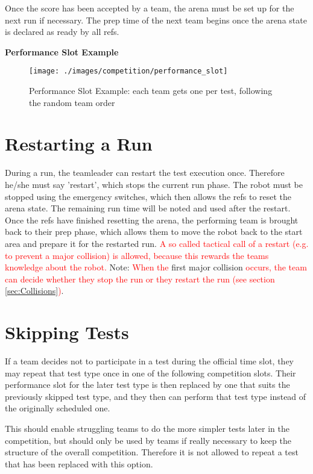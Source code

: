 Once the score has been accepted by a team,
the arena must be set up for the next run if necessary.
The prep time of the next team begins once the arena state is declared as ready by all refs.

\textbf{Performance Slot Example}

\begin{figure} [h!]
	\begin{center}
		\texttt{[image: ./images/competition/performance\_slot]}
	\end{center}
	\caption{Performance Slot Example: each team gets one per test, following the random team order}
	\label{fig:performance slot example}
\end{figure}


\section{Restarting a Run}

During a run, the teamleader can restart the test execution once.
Therefore he/she must say 'restart', which stops the current run phase. The robot must be stopped using the emergency switches, which then allows the refs to reset the arena state.
The remaining run time will be noted and used after the restart. Once the refs have finished resetting the arena, the performing team is brought back to their prep phase, which allows them to move the robot back to the start area and prepare it for the restarted run.
\textcolor{red}{A so called tactical call of a restart (e.g. to prevent a major collision) is allowed, because this rewards the teams knowledge about the robot.}
Note: \textcolor{red}{When the} first major collision \textcolor{red}{occurs, the team can decide whether they stop the run or they restart the run (see section \ref{sec:Collisions})}.


\section{Skipping Tests}

If a team decides not to participate in a test during the official time slot, 
they may repeat that test type once in one of the following competition slots.
Their performance slot for the later test type is then replaced by one that suits the previously skipped test type, and they then can perform that test type instead of the originally scheduled one.

This should enable struggling teams to do the more simpler tests later in the competition,
but should only be used by teams if really necessary to keep the structure of the overall competition. 
Therefore it is not allowed to repeat a test that has been replaced with this option.

